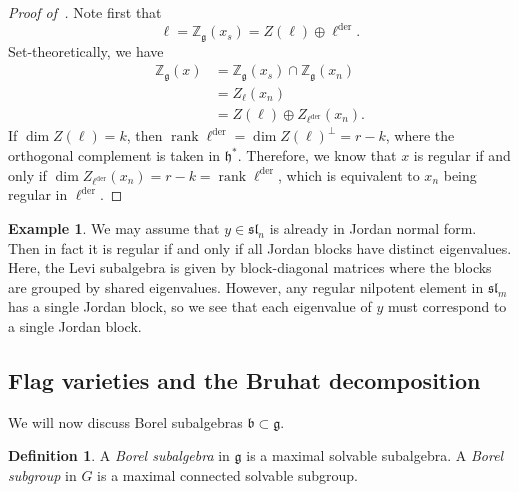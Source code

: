 \documentclass{amsart}
\theoremstyle{definition}
\newtheorem{defn}[thm]{Definition}
\newtheorem{exm}[thm]{Example}
\theoremstyle{remark}
\theoremstyle{plain}
\theoremstyle{definition}
\theoremstyle{remark}
\newcommand{\Z}{\mathbb{Z}}
\newcommand{\g}{\mathfrak{g}}
\newcommand{\h}{\mathfrak{h}}
\renewcommand{\b}{\mathfrak{b}}
\newcommand{\mf}[1]{\mathfrak{#1}}
\newcommand{\on}[1]{\operatorname{#1}}
\newcommand{\1}{\mathbf{1}}
\newcommand{\2}{\mathbf{2}}
\newcommand{\3}{\mathbf{3}}
\renewcommand{\sl}{\mf{sl}}
\begin{document}
\begin{proof}[Proof of~]
    Note first that
    \[ \ell = \Z_{\g}(x_s) = Z(\ell) \oplus \ell^{\on{der}}. \]
    Set-theoretically, we have
    \begin{align*}
        \Z_{\g} (x) &= \Z_{\g}(x_s) \cap \Z_{\g}(x_n) \\
        &= Z_{\ell}(x_n)  \\
        &= Z(\ell) \oplus Z_{\ell^{\on{der}}}(x_n). 
    \end{align*}
    If \(\dim Z(\ell) = k\), then \(\on{rank} \ell^{\on{der}} = \dim Z(\ell)^{\perp} = r-k\), where the orthogonal complement is taken in \(\h^*\). Therefore, we know that \(x\) is regular if and only if \(\dim Z_{\ell^{\on{der}}}(x_n) = r-k = \on{rank} \ell^{\on{der}}\), which is equivalent to \(x_n\) being regular in \(\ell^{\on{der}}\).
\end{proof}

\begin{exm}
    We may assume that \(y \in \sl_n\) is already in Jordan normal form. Then in fact it is regular if and only if all Jordan blocks have distinct eigenvalues. Here, the Levi subalgebra is given by block-diagonal matrices where the blocks are grouped by shared eigenvalues. However, any regular nilpotent element in \(\sl_m\) has a single Jordan block, so we see that each eigenvalue of \(y\) must correspond to a single Jordan block.
\end{exm}

\subsection{Flag varieties and the Bruhat decomposition}%
\label{sub:Flag varieties and the Bruhat decomposition}

We will now discuss Borel subalgebras \(\b \subset \g\).

\begin{defn}
    A \textit{Borel subalgebra} in \(\g\) is a maximal solvable subalgebra. A \textit{Borel subgroup} in \(G\) is a maximal connected solvable subgroup.
\end{defn}
\end{document}
